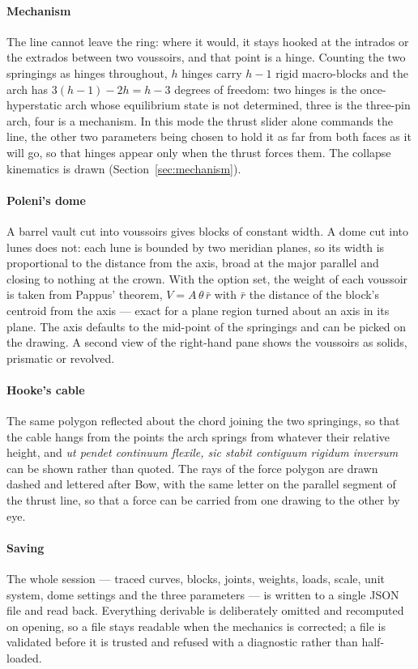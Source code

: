 \documentclass[final,3p,times,twocolumn]{elsarticle}
\begin{document}
\paragraph{Mechanism} The line cannot leave the ring: where it would, it stays
hooked at the intrados or the extrados between two voussoirs, and that point is
a hinge. Counting the two springings as hinges throughout, $h$ hinges carry
$h-1$ rigid macro-blocks and the arch has $3(h-1)-2h = h-3$ degrees of freedom:
two hinges is the once-hyperstatic arch whose equilibrium state is not
determined, three is the three-pin arch, four is a mechanism. In this mode the
thrust slider alone commands the line, the other two parameters being chosen to
hold it as far from both faces as it will go, so that hinges appear only when
the thrust forces them. The collapse kinematics is drawn
(Section~\ref{sec:mechanism}).

\paragraph{Poleni's dome} A barrel vault cut into voussoirs gives blocks of
constant width. A dome cut into lunes does not: each lune is bounded by two
meridian planes, so its width is proportional to the distance from the axis,
broad at the major parallel and closing to nothing at the crown. With the
option set, the weight of each voussoir is taken from Pappus' theorem,
$V = A\,\theta\,\bar r$ with $\bar r$ the distance of the block's centroid from
the axis --- exact for a plane region turned about an axis in its plane. The
axis defaults to the mid-point of the springings and can be picked on the
drawing. A second view of the right-hand pane shows the voussoirs as solids,
prismatic or revolved.

\paragraph{Hooke's cable} The same polygon reflected about the chord joining
the two springings, so that the cable hangs from the points the arch springs
from whatever their relative height, and \emph{ut pendet continuum flexile,
sic stabit contiguum rigidum inversum} \cite{Hooke1676} can be shown rather
than quoted. The rays of the force polygon are drawn dashed and lettered after
Bow, with the same letter on the parallel segment of the thrust line, so that a
force can be carried from one drawing to the other by eye.

\paragraph{Saving} The whole session --- traced curves, blocks, joints,
weights, loads, scale, unit system, dome settings and the three parameters ---
is written to a single JSON file and read back. Everything derivable is
deliberately omitted and recomputed on opening, so a file stays readable when
the mechanics is corrected; a file is validated before it is trusted and
refused with a diagnostic rather than half-loaded.
\end{document}
